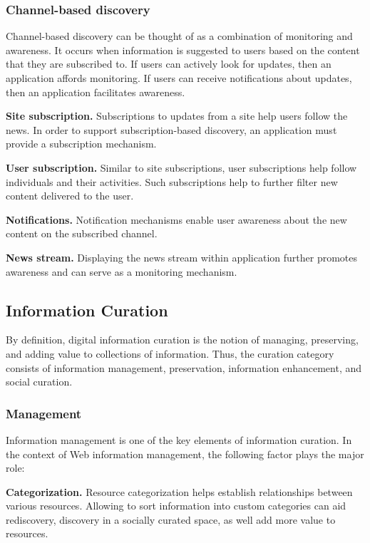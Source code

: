 \documentclass{casconpaper}
\begin{document}
{\subsubsection{Channel-based discovery}
Channel-based discovery can be thought of as a combination of monitoring and awareness. It occurs when information is suggested to users based on the content that they are subscribed to. If users can actively look for updates, then an application affords monitoring. If users can receive notifications about updates, then an application facilitates awareness.                            


\textbf{Site subscription.} Subscriptions to updates from a site help users follow the news. In order to support subscription-based discovery, an application must provide a subscription mechanism.

\textbf{User subscription.} Similar to site subscriptions, user subscriptions help follow individuals and their activities. Such subscriptions help to further filter new content delivered to the user.

\textbf{Notifications.} Notification mechanisms enable user awareness about the  new content on the subscribed channel. 

\textbf{News stream.} Displaying the news stream within application further promotes awareness and can serve as a monitoring mechanism.

} %

{\subsection{Information Curation}
By definition, digital information curation is the notion of managing, preserving, and adding value to collections of information. Thus, the curation category consists of information management, preservation, information enhancement, and social curation.  
} %

{\subsubsection{Management}
Information management is one of the key elements of information curation. In the context of Web information management, the following factor plays the major role:

\textbf{Categorization.} Resource categorization helps establish relationships between various resources. Allowing to sort information into custom categories can aid rediscovery, discovery in a socially curated space, as well add more value to resources.

} %
\end{document}
